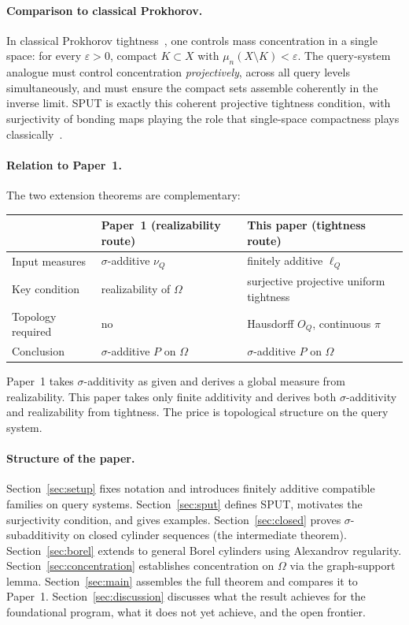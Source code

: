\documentclass[11pt]{article}
\theoremstyle{definition}
\begin{document}
\paragraph{Comparison to classical Prokhorov.}
In classical Prokhorov tightness~\cite{Prokhorov1956}, one controls mass concentration in
a single space: for every $\varepsilon > 0$, compact $K \subset X$
with $\mu_n(X \setminus K) < \varepsilon$.  The query-system
analogue must control concentration \emph{projectively}, across all
query levels simultaneously, and must ensure the compact sets
assemble coherently in the inverse limit.  SPUT is exactly this
coherent projective tightness condition, with surjectivity of
bonding maps playing the role that single-space compactness plays
classically~\cite{Parthasarathy1967}.

\paragraph{Relation to Paper~1.}
The two extension theorems are complementary:

\begin{center}
\begin{tabular}{lll}
\toprule
& Paper~1 (realizability route) & This paper (tightness route) \\
\midrule
Input measures & $\sigma$-additive $\nu_Q$ & finitely additive $\ell_Q$ \\
Key condition & realizability of $\Omega$ & surjective projective uniform tightness \\
Topology required & no & Hausdorff $O_Q$, continuous $\pi$ \\
Conclusion & $\sigma$-additive $P$ on $\Omega$ & $\sigma$-additive $P$ on $\Omega$ \\
\bottomrule
\end{tabular}
\end{center}

\noindent
Paper~1 takes $\sigma$-additivity as given and derives a global
measure from realizability.  This paper takes only finite additivity
and derives both $\sigma$-additivity and realizability from tightness.
The price is topological structure on the query system.

\paragraph{Structure of the paper.}
Section~\ref{sec:setup} fixes notation and introduces finitely
additive compatible families on query systems.
Section~\ref{sec:sput} defines SPUT, motivates the surjectivity
condition, and gives examples.
Section~\ref{sec:closed} proves $\sigma$-subadditivity on closed
cylinder sequences (the intermediate theorem).
Section~\ref{sec:borel} extends to general Borel cylinders using
Alexandrov regularity.
Section~\ref{sec:concentration} establishes concentration on $\Omega$
via the graph-support lemma.
Section~\ref{sec:main} assembles the full theorem and compares it to
Paper~1.
Section~\ref{sec:discussion} discusses what the result achieves for
the foundational program, what it does not yet achieve, and the
open frontier.
\end{document}
